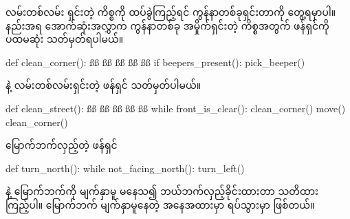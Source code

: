 လမ်းတစ်လမ်း ရှင်းတဲ့ ကိစ္စကို ထပ်ခွဲကြည့်ရင် ကွန်နာတစ်ခုရှင်းတာကို တွေ့ရမှာပါ။  နည်းအရ အောက်ဆုံးအလွှာက ကွန်နာတစ်ခု အမှိုက်ရှင်းတဲ့ ကိစ္စအတွက် ဖန်ရှင်ကို ပထမဆုံး သတ်မှတ်ရပါမယ်။
%
\begin{py}
def clean_corner():
    ßß
    ßß
    ßß
    ßß
    ßß
    if beepers_present():
        pick_beeper()
\end{py}
%
 နဲ့ လမ်းတစ်လမ်းရှင်းတဲ့ ဖန်ရှင် သတ်မှတ်ပါမယ်။
%
\begin{py}
def clean_street():
    ßß
    ßß
    ßß
    ßß
    ßß
    while front_is_clear():
        clean_corner()
        move()
    clean_corner()
\end{py}
%
မြောက်ဘက်လှည့်တဲ့ ဖန်ရှင်
%
\begin{py}
def turn_north():
    while not_facing_north():
        turn_left()
\end{py}
%
  နဲ့ မြောက်ဘက်ကို မျက်နှာမူ မနေသ၍ ဘယ်ဘက်လှည့်ခိုင်းထားတာ သတိထားကြည့်ပါ။ မြောက်ဘက် မျက်နှာမူနေတဲ့ အနေအထားမှာ ရပ်သွားမှာ ဖြစ်တယ်။

